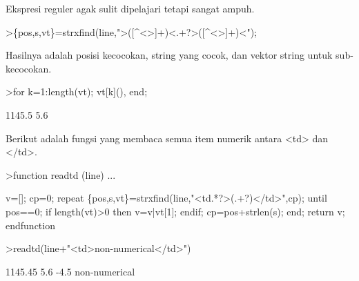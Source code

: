 \documentclass[a4paper,10pt]{article}
\begin{document}
\begin{eulernotebook}
\begin{eulercomment}
\begin{eulercomment}
\begin{eulercomment}
\begin{eulercomment}
\begin{eulercomment}
\begin{eulercomment}
\begin{eulercomment}
\begin{eulercomment}
\begin{eulercomment}
\begin{eulercomment}
\begin{eulercomment}
\begin{eulercomment}
\begin{eulercomment}
\begin{eulercomment}
\begin{eulercomment}
\begin{eulercomment}
\begin{eulercomment}
\begin{eulercomment}
\begin{eulercomment}
\begin{eulercomment}
\begin{eulercomment}
\begin{eulercomment}
\begin{eulercomment}
\begin{eulercomment}
\begin{eulercomment}
\begin{eulercomment}
\begin{eulercomment}
\begin{eulercomment}
\begin{eulercomment}
\begin{eulercomment}
\begin{eulercomment}
\begin{eulercomment}
\begin{eulercomment}
\begin{eulercomment}
\begin{eulercomment}
\begin{eulercomment}
\begin{eulercomment}
Ekspresi reguler agak sulit dipelajari tetapi sangat ampuh.
\end{eulercomment}
\begin{eulerprompt}
>\{pos,s,vt\}=strxfind(line,">([^<>]+)<.+?>([^<>]+)<");
\end{eulerprompt}
\begin{eulercomment}
Hasilnya adalah posisi kecocokan, string yang cocok, dan vektor string
untuk sub-kecocokan.
\end{eulercomment}
\begin{eulerprompt}
>for k=1:length(vt); vt[k](), end;
\end{eulerprompt}
\begin{euleroutput}
  1145.5
  5.6
\end{euleroutput}
\begin{eulercomment}
Berikut adalah fungsi yang membaca semua item numerik antara \textless{}td\textgreater{} dan
\textless{}/td\textgreater{}.
\end{eulercomment}
\begin{eulerprompt}
>function readtd (line) ...
\end{eulerprompt}
\begin{eulerudf}
  v=[]; cp=0;
  repeat
     \{pos,s,vt\}=strxfind(line,"<td.*?>(.+?)</td>",cp);
     until pos==0;
     if length(vt)>0 then v=v|vt[1]; endif;
     cp=pos+strlen(s);
  end;
  return v;
  endfunction
\end{eulerudf}
\begin{eulerprompt}
>readtd(line+"<td>non-numerical</td>")
\end{eulerprompt}
\begin{euleroutput}
  1145.45
  5.6
  -4.5
  non-numerical
\end{euleroutput}

\end{eulercomment}
\end{eulercomment}
\end{eulercomment}
\end{eulercomment}
\end{eulercomment}
\end{eulercomment}
\end{eulercomment}
\end{eulercomment}
\end{eulercomment}
\end{eulercomment}
\end{eulercomment}
\end{eulercomment}
\end{eulercomment}
\end{eulercomment}
\end{eulercomment}
\end{eulercomment}
\end{eulercomment}
\end{eulercomment}
\end{eulercomment}
\end{eulercomment}
\end{eulercomment}
\end{eulercomment}
\end{eulercomment}
\end{eulercomment}
\end{eulercomment}
\end{eulercomment}
\end{eulercomment}
\end{eulercomment}
\end{eulercomment}
\end{eulercomment}
\end{eulercomment}
\end{eulercomment}
\end{eulercomment}
\end{eulercomment}
\end{eulercomment}
\end{eulercomment}
\end{eulernotebook}
\end{document}
